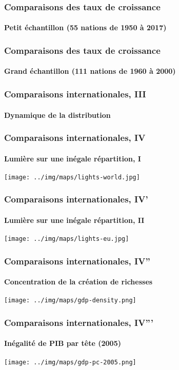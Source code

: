 \documentclass[10pt,notheorems]{beamer}
\theoremstyle{plain}
\theoremstyle{definition} %
\begin{document}
\begin{frame}
  \frametitle{Comparaisons des taux de croissance}
  \framesubtitle{Petit échantillon (55 nations de 1950 à 2017)}

  \begin{Center}
    
  \end{Center}

\end{frame}


\begin{frame}
  \frametitle{Comparaisons des taux de croissance}
  \framesubtitle{Grand échantillon (111 nations de 1960 à 2000)}

  \begin{Center}
    
  \end{Center}

\end{frame}


\begin{frame}
  \frametitle{Comparaisons internationales, III}
  \framesubtitle{Dynamique de la distribution}

  \begin{center}
    
  \end{center}

\end{frame}


\begin{frame}
  \frametitle{Comparaisons internationales, IV}
  \framesubtitle{Lumière sur une inégale répartition, I}

  \begin{center}
    \texttt{[image: ../img/maps/lights-world.jpg]}
  \end{center}

\end{frame}


\begin{frame}
  \frametitle{Comparaisons internationales, IV'}
  \framesubtitle{Lumière sur une inégale répartition, II}

  \begin{center}
    \texttt{[image: ../img/maps/lights-eu.jpg]}
  \end{center}

\end{frame}


\begin{frame}
  \frametitle{Comparaisons internationales, IV''}
  \framesubtitle{Concentration de la création de richesses}

  \begin{center}
    \texttt{[image: ../img/maps/gdp-density.png]}
  \end{center}

\end{frame}


\begin{frame}
  \frametitle{Comparaisons internationales, IV'''}
  \framesubtitle{Inégalité de PIB par tête (2005)}

  \begin{center}
    \texttt{[image: ../img/maps/gdp-pc-2005.png]}
  \end{center}

\end{frame}
\end{document}
